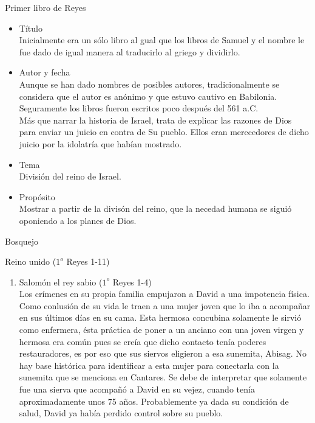 %

%
\begin{section}{Primer libro de Reyes}
	\begin{itemize}
		\item Título\\
			Inicialmente era un sólo libro al gual que los libros de Samuel y el nombre le fue dado de igual manera al traducirlo al griego y dividirlo.
		\item Autor y fecha\\
			Aunque se han dado nombres de posibles autores, tradicionalmente se considera que el autor es anónimo y que estuvo cautivo en Babilonia. Seguramente los libros fueron escritos poco después del 561 a.C. \\
			Más que narrar la historia de Israel, trata de explicar las razones de Dios para enviar un juicio en contra de Su pueblo. Ellos eran merecedores de dicho juicio por la idolatría que habían mostrado.
		\item Tema\\
			División del reino de Israel.
		\item Propósito\\
			Mostrar a partir de la divisón del reino, que la necedad humana se siguió oponiendo a los planes de Dios.
	\end{itemize}
	\begin{subsection}{Bosquejo}
		\begin{subsubsection}{Reino unido ($1^{o}$ Reyes 1-11)}
			\begin{enumerate}
				\item Salomón el rey sabio ($1^{o}$ Reyes 1-4)\\
					Los crímenes en su propia familia empujaron a David a una impotencia física. Como conlusión de su vida le traen a una mujer joven que lo iba a acompañar en sus últimos días en su cama. Esta hermosa concubina solamente le sirvió como enfermera, ésta práctica de poner a un anciano con una joven virgen y hermosa era común pues se creía que dicho contacto tenía poderes restauradores, es por eso que sus siervos eligieron a esa sunemita, Abisag. No hay base histórica para identificar a esta mujer para conectarla con la sunemita que se menciona en Cantares. Se debe de interpretar que solamente fue una sierva que acompañó a David en su vejez, cuando tenía aproximadamente unos 75 años. Probablemente ya dada su condición de salud, David ya había perdido control sobre su pueblo. \\ \\

\end{enumerate}
\end{subsubsection}
\end{subsection}
\end{section}
